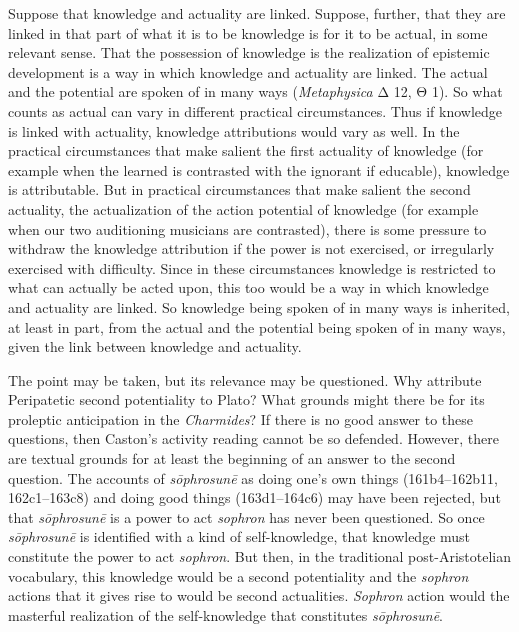 Suppose that knowledge and actuality are linked. Suppose, further, that they are linked in that part of what it is to be knowledge is for it to be actual, in some relevant sense. That the possession of knowledge is the realization of epistemic development is a way in which knowledge and actuality are linked. The actual and the potential are spoken of in many ways (\emph{Metaphysica} {\sbl Δ} 12, {\sbl Θ} 1). So what counts as actual can vary in different practical circumstances. Thus if knowledge is linked with actuality, knowledge attributions would vary as well. In the practical circumstances that make salient the first actuality of knowledge (for example when the learned is contrasted with the ignorant if educable), knowledge is attributable. But in practical circumstances that make salient the second actuality, the actualization of the action potential of knowledge (for example when our two auditioning musicians are contrasted), there is some pressure to withdraw the knowledge attribution if the power is not exercised, or irregularly exercised with difficulty. Since in these circumstances knowledge is restricted to what can actually be acted upon, this too would be a way in which knowledge and actuality are linked. So knowledge being spoken of in many ways is inherited, at least in part, from the actual and the potential being spoken of in many ways, given the link between knowledge and actuality.

The point may be taken, but its relevance may be questioned. Why attribute Peripatetic second potentiality to Plato? What grounds might there be for its proleptic anticipation in the \emph{Charmides}? If there is no good answer to these questions, then Caston's activity reading cannot be so defended. However, there are textual grounds for at least the beginning of an answer to the second question. The accounts of \emph{sōphrosunē} as doing one's own things (161b4–162b11, 162c1–163c8) and doing good things (163d1–164c6) may have been rejected, but that \emph{sōphrosunē} is a power to act \emph{sophron} has never been questioned. So once \emph{sōphrosunē} is identified with a kind of self-knowledge, that knowledge must constitute the power to act \emph{sophron}. But then, in the traditional post-Aristotelian vocabulary, this knowledge would be a second potentiality and the \emph{sophron} actions that it gives rise to would be second actualities. \emph{Sophron} action would the masterful realization of the self-knowledge that constitutes \emph{sōphrosunē}. 

